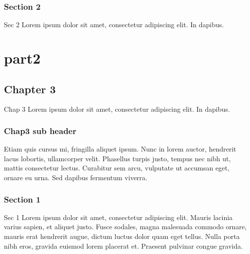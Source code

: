 \section{Section 2}
\label{\detokenize{part1/sec2:section-2}}\label{\detokenize{part1/sec2::doc}}
\sphinxAtStartPar
Sec 2 Lorem ipsum dolor sit amet, consectetur adipiscing elit. In dapibus.


\part{part2}


\chapter{Chapter 3}
\label{\detokenize{part2/chap3:chapter-3}}\label{\detokenize{part2/chap3::doc}}
\sphinxAtStartPar
Chap 3 Lorem ipsum dolor sit amet, consectetur adipiscing elit. In dapibus.


\section{Chap3 sub header}
\label{\detokenize{part2/chap3:chap3-sub-header}}
\sphinxAtStartPar
Etiam quis cursus mi, fringilla aliquet ipsum. Nunc in lorem auctor, hendrerit lacus lobortis, ullamcorper velit. Phasellus turpis justo, tempus nec nibh ut, mattis consectetur lectus. Curabitur sem arcu, vulputate ut accumsan eget, ornare eu urna. Sed dapibus fermentum viverra.


\section{Section 1}
\label{\detokenize{part2/sec1:section-1}}\label{\detokenize{part2/sec1::doc}}
\sphinxAtStartPar
Sec 1 Lorem ipsum dolor sit amet, consectetur adipiscing elit. Mauris lacinia varius sapien, et aliquet justo. Fusce sodales, magna malesuada commodo ornare, mauris erat hendrerit augue, dictum luctus dolor quam eget tellus. Nulla porta nibh eros, gravida euismod lorem placerat et. Praesent pulvinar congue gravida.

